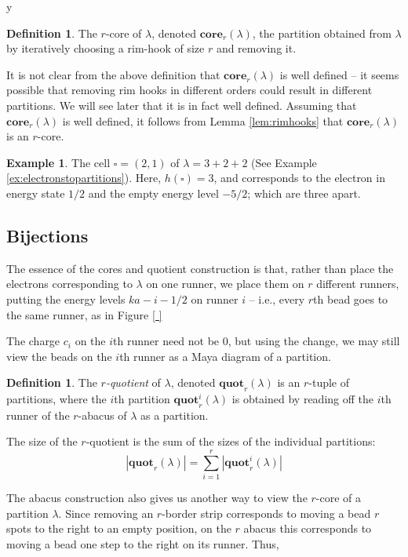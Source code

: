 y\documentclass{amsart}[12pt]
\theoremstyle{definition}
\newtheorem{example}[dummy]{Example}
\newtheorem{definition}[dummy]{Definition}
\newcommand{\core}{\mathbf{core}}
\newcommand{\quot}{\mathbf{quot}}
\begin{document}
\begin{definition} 
The $r$-core of $\lambda$, denoted $\core_r(\lambda)$, the partition obtained from $\lambda$ by iteratively choosing a rim-hook of size $r$ and removing it.
\end{definition}

It is not clear from the above definition that $\core_r(\lambda)$ is well defined -- it seems possible that removing rim hooks in different orders could result in different partitions.  We will see later that it is in fact well defined.  Assuming that $\core_r(\lambda)$ is well defined, it follows from Lemma \ref{lem:rimhooks} that $\core_r(\lambda)$ is an $r$-core.


\begin{example}
The cell $\square=(2,1)$ of $\lambda=3+2+2$ (See Example \ref{ex:electronstopartitions}).
Here, $h(\square)=3$, and corresponds to the electron in energy state $1/2$
and the empty energy level $-5/2$; which are three apart.

\end{example}

\subsection{Bijections}

The essence of the cores and quotient construction is that, rather than place the electrons corresponding to $\lambda$ on one runner, we place them on $r$ different runners, putting the energy levels $ka-i-1/2$ on runner $i$ -- i.e., every $r$th bead goes to the same runner, as in Figure \ref{ }

The charge $c_i$ on the $i$th runner need not be 0, but using the change, we may still view the beads on the $i$th runner as a Maya diagram of a partition.  


\begin{definition} \label{def:quotients}
The \emph{$r$-quotient} of $\lambda$, denoted $\quot_r(\lambda)$ is an $r$-tuple of partitions, where the $i$th partition $\quot_r^i(\lambda)$ is obtained by reading off the $i$th runner of the $r$-abacus of $\lambda$ as a partition.

The size of the $r$-quotient is the sum of the sizes of the individual partitions: 
$$|\quot_r(\lambda)|=\sum_{i=1}^r |\quot_r^i(\lambda)|$$
\end{definition}

The abacus construction also gives us another way to view the $r$-core of a partition $\lambda$.  Since removing an $r$-border strip corresponds to moving a bead $r$ spots to the right to an empty position, on the $r$ abacus this corresponds to moving a bead one step to the right on its runner.  Thus, 
\end{document}
